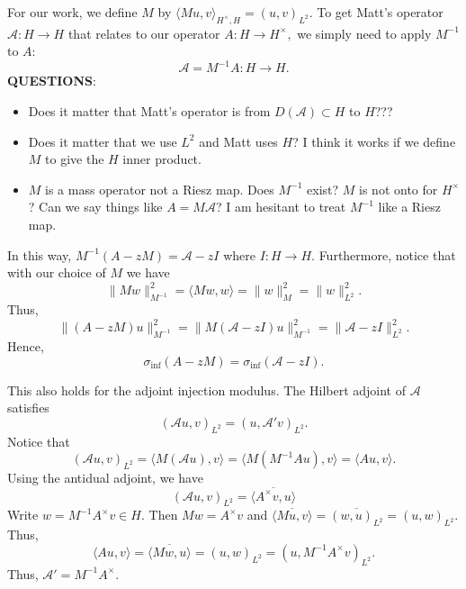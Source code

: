\documentclass[12pt,a4paper]{article}
\theoremstyle{boldthm}
\theoremstyle{bolddefn}
\begin{document}
For our work, we define $M$ by $\langle Mu, v \rangle_{H^{\times}, H} = (u, v)_{L^2}.$ To get Matt's operator $\mathcal{A} : H \rightarrow H$ that relates to our operator $A : H \rightarrow H^{\times},$ we simply need to apply $M^{-1}$ to $A:$
\begin{equation}
    \mathcal{A} = M^{-1} A : H \rightarrow H.
\end{equation}
\textbf{QUESTIONS}:
\begin{itemize}
    \item Does it matter that Matt's operator is from $D(\mathcal{A}) \subset H$ to $H$???
    \item Does it matter that we use $L^2$ and Matt uses $H$? I think it works if we define $M$ to give the $H$ inner product.
    \item $M$ is a mass operator not a Riesz map. Does $M^{-1}$ exist? $M$ is not onto for $H^{\times}$? Can we say things like $A = M \mathcal{A}$? I am hesitant to treat $M^{-1}$ like a Riesz map.

\end{itemize}
In this way, $M^{-1}(A-zM) = \mathcal{A} - zI$ where $I : H \rightarrow H.$ Furthermore, notice that with our choice of $M$ we have 
\begin{equation}
    \| M w \|_{M^{-1}}^2 = \langle Mw, w \rangle = \|w \|_M^2 = \|w \|_{L^2}^2.
\end{equation}
Thus,
\begin{equation}
    \|(A-zM) u \|_{M^{-1}}^2 = \|M(\mathcal{A} - zI) u \|_{M^{-1}}^2 = \| \mathcal{A} - zI\|_{L^2}^2.
\end{equation}
Hence,
\begin{equation}
    \sigma_{\inf}(A-zM) = \sigma_{\inf}(\mathcal{A}-zI).
\end{equation}

This also holds for the adjoint injection modulus. The Hilbert adjoint of $\mathcal{A}$ satisfies 
\begin{equation}
    (\mathcal{A}u, v)_{L^2} = (u, \mathcal{A}'v)_{L^2}.
\end{equation}
Notice that
\begin{equation}
    (\mathcal{A}u, v)_{L^2} = \langle M(\mathcal{A} u), v \rangle = \langle M(M^{-1} Au), v \rangle = \langle Au, v \rangle.
\end{equation}
Using the antidual adjoint, we have 
\begin{equation}
    (\mathcal{A}u, v)_{L^2} = \overline{ \langle A^{\times} v, u \rangle}
\end{equation}
Write $w = M^{-1} A^{\times} v \in H.$ Then $Mw = A^{\times} v$ and 
$\overline{ \langle Mu, v \rangle} = \overline{(w, u)_{L^2}} = (u, w)_{L^2}.$ Thus,
\begin{equation}
    \langle Au, v \rangle = \overline {\langle Mw, u \rangle} = (u, w)_{L^2} = (u, M^{-1} A^{\times} v)_{L^2}. 
\end{equation}
Thus, $\mathcal{A}' = M^{-1} A^{\times}.$
\end{document}
